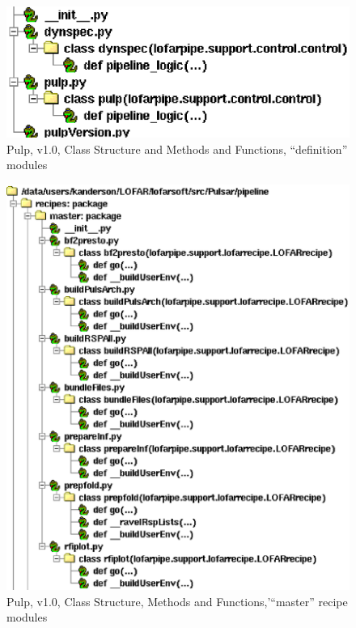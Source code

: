 \documentclass[a4paper,10pt,bibtotoc]{scrartcl}
\begin{document}
\begin{figure}[htbp] 
  \begin{center}
    \includegraphics[scale=0.95]{pulpTop.eps} 
  \end{center}
  \caption{Pulp, v1.0, Class Structure and Methods and Functions,
    ``definition'' modules}
\end{figure}

\begin{figure}[htbp] 
  \begin{center}
    \includegraphics[scale=0.90]{pulpMaster.eps}
  \end{center}
  \caption{Pulp, v1.0, Class Structure, Methods and
    Functions,'``master'' recipe modules}
\end{figure}
\end{document}
